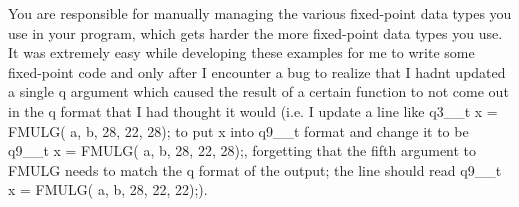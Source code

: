 \begin{DoxyEnumerate}
\item You are responsible for manually managing the various fixed-\/point data types you use in your program, which gets harder the more fixed-\/point data types you use. It was extremely easy while developing these examples for me to write some fixed-\/point code and only after I encounter a bug to realize that I hadn\textquotesingle{}t updated a single {\ttfamily q} argument which caused the result of a certain function to not come out in the q format that I had thought it would (i.\+e. I update a line like {\ttfamily q3\+\_\+\_\+t x = F\+M\+U\+L\+G( a, b, 28, 22, 28);} to put {\ttfamily x} into {\ttfamily q9\+\_\+\_\+t} format and change it to be {\ttfamily q9\+\_\+\_\+t x = F\+M\+U\+L\+G( a, b, 28, 22, 28);}, forgetting that the fifth argument to {\ttfamily F\+M\+U\+LG} needs to match the q format of the output; the line should read {\ttfamily q9\+\_\+\_\+t x = F\+M\+U\+L\+G( a, b, 28, 22, 22);}).

\end{DoxyEnumerate}
